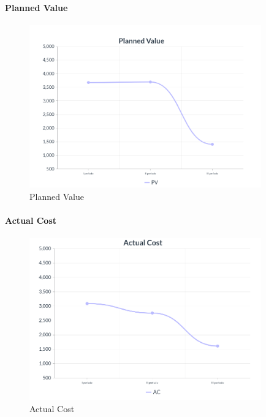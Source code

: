 \paragraph{Planned Value}
\begin{center}
\begin{figure}[H]
  \centering
  \renewcommand{\thefigure}{1}
  \includegraphics[width=10cm]{./res/images/PVGraph.png}
  \caption{Planned Value}
  \label{fig:Grafico Planned Value}
\end{figure}
\end{center}
\pagebreak
\paragraph{Actual Cost}
\begin{center}
\begin{figure}[H]
  \centering
  \renewcommand{\thefigure}{2}
  \includegraphics[width=10cm]{./res/images/ACGraph.png}
  \caption{Actual Cost}
  \label{fig:Grafico Actual Cost}
\end{figure}
\end{center}
